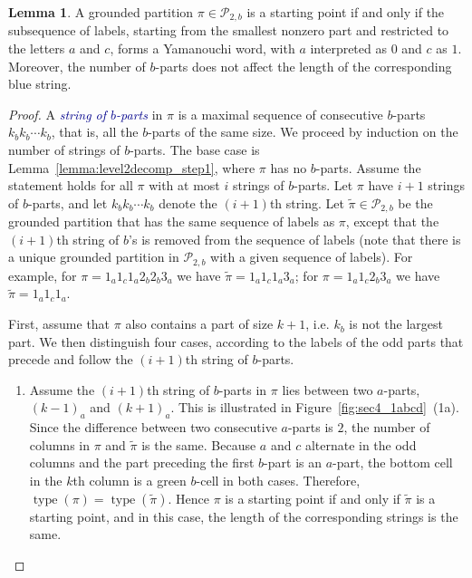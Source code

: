 \documentclass[11pt]{article}
\theoremstyle{definition}
\newtheorem{lemma}[theorem]{Lemma}
\theoremstyle{remark}
\theoremstyle{definition}
\numberwithin{equation}{section}
\newcommand{\type}{\operatorname{type}}
\renewcommand\emph[1]{\textcolor{darkblue}{\it #1}}
\begin{document}
\begin{lemma}\label{lemma:level2decomp_step2}
  A grounded partition \( \pi \in\mathcal{P}_{2,b}\) is a starting
  point if and only if the subsequence of labels, starting from the
  smallest nonzero part and restricted to the letters \( a \) and
  \( c \), forms a Yamanouchi word, with \( a \) interpreted as
  \( 0 \) and \( c \) as \( 1 \). Moreover, the number of
  \( b \)-parts does not affect the length of the corresponding blue
  string.
\end{lemma}
\begin{proof}
  A \emph{string of \(b\)-parts} in \(\pi\) is a maximal sequence of
  consecutive \(b\)-parts \(k_b k_b\cdots k_b\), that is, all the
  \(b\)-parts of the same size. We proceed by induction on the number
  of strings of \(b\)-parts. The base case is
  Lemma~\ref{lemma:level2decomp_step1}, where \(\pi\) has no
  \(b\)-parts. Assume the statement holds for all \(\pi\) with at most
  \(i\) strings of \(b\)-parts. Let \(\pi\) have \(i+1\) strings of \(b\)-parts, and let \(k_b k_b \cdots k_b\) denote the
  \((i+1)\)th string. Let \(\tilde{\pi} \in \mathcal{P}_{2,b}\) be
  the grounded partition that has the same sequence of labels as \(\pi\),
  except that the \((i+1)\)th string of \(b\)’s is removed from the
  sequence of labels (note that there is a unique grounded partition in
  \(\mathcal{P}_{2,b}\) with a given sequence of labels). For example,
  for \(\pi=1_a1_c1_a2_b2_b3_a\) we have \(\tilde{\pi}=1_a1_c1_a3_a\);
  for \(\pi=1_a1_c2_b3_a\) we have \(\tilde{\pi}=1_a1_c1_a\).

  First, assume that \(\pi\) also contains a part of size \(k+1\),
  i.e. \(k_b\) is not the largest part. We then distinguish four
  cases, according to the labels of the odd parts that precede and
  follow the \((i+1)\)th string of \(b\)-parts.

\begin{enumerate}[label=(1\alph*)]
\item Assume the $(i+1)$th string of \( b \)-parts in $\pi$ lies between two \( a \)-parts, $(k-1)_a$ and $(k+1)_a$. This is illustrated in Figure~\ref{fig:sec4_1abcd}~(1a). Since the difference between two consecutive \(a\)-parts is \(2\), the number of columns in \(\pi\) and \(\tilde{\pi}\) is the same.  
Because \(a\) and \(c\) alternate in the odd columns and the part preceding the first $b$-part is an $a$-part, the bottom cell in the $k$th column is a green \(b\)-cell in both cases. Therefore, \(\type(\pi) = \type(\tilde{\pi})\). Hence $\pi$ is a starting point if and only if $\tilde{\pi}$ is a starting point, and in this case, the length of the corresponding strings is the same.


\end{enumerate}
\end{proof}
\end{document}
